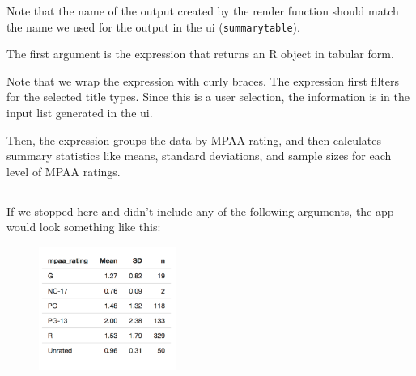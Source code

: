 \documentclass[
  letterpaper,
  DIV=11,
  numbers=noendperiod]{scrreprt}
\newenvironment{Shaded}{\begin{snugshade}}{\end{snugshade}}
\newcommand{\AttributeTok}[1]{\textcolor[rgb]{0.40,0.46,0.14}{#1}}
\newcommand{\FunctionTok}[1]{\textcolor[rgb]{0.28,0.35,0.67}{#1}}
\newcommand{\NormalTok}[1]{\textcolor[rgb]{0.00,0.46,0.62}{#1}}
\newcommand{\SpecialCharTok}[1]{\textcolor[rgb]{0.37,0.37,0.37}{#1}}
\begin{document}
Note that the name of the output created by the render function should
match the name we used for the output in the ui (\texttt{summarytable}).

The first argument is the expression that returns an R object in tabular
form.

\begin{Shaded}
\end{Shaded}

Note that we wrap the expression with curly braces. The expression first
filters for the selected title types. Since this is a user selection,
the information is in the input list generated in the ui.

Then, the expression groups the data by MPAA rating, and then calculates
summary statistics like means, standard deviations, and sample sizes for
each level of MPAA ratings.

\hypertarget{section-24}{%
\subsection{}\label{section-24}}

If we stopped here and didn't include any of the following arguments,
the app would look something like this:

\begin{figure}

{\centering \includegraphics[width=0.4\textwidth,height=\textheight]{./images/summary-table.png}

}

\end{figure}
\end{document}
